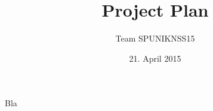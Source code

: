 \documentclass{beamer}
\title[Project Plan]{Project Plan}
\author[SPUNIKNSS15]{Team SPUNIKNSS15}
\date[21.4.15]{21. April 2015}
\begin{document}
\frame{\titlepage}

\begin{frame}
Bla
\end{frame}
\end{document}
